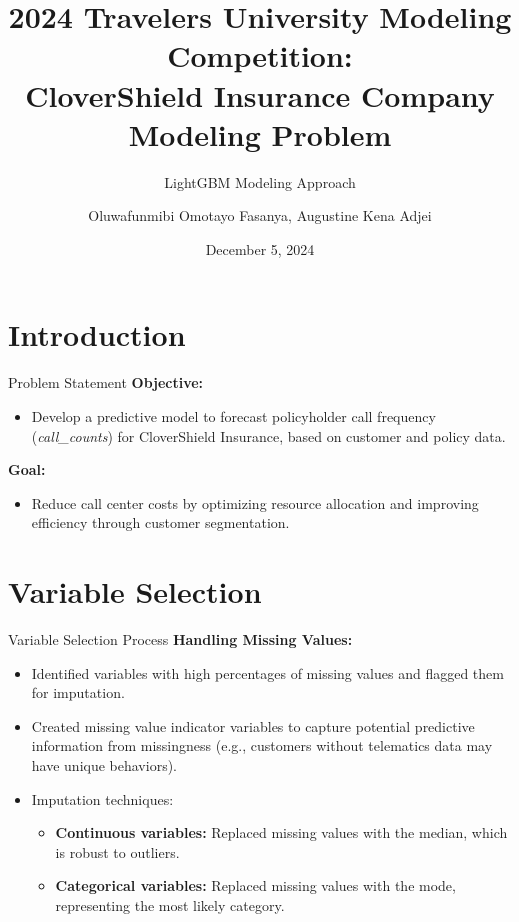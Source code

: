 \documentclass{beamer}\usepackage[]{graphicx}\usepackage[]{xcolor}
\title[Travelers University Modeling Competition]{2024 Travelers University Modeling Competition: \\ CloverShield Insurance Company Modeling Problem}
\subtitle{LightGBM Modeling Approach}
\author[O.F. Fasanya and A.K. Adjei]{Oluwafunmibi Omotayo Fasanya, Augustine Kena Adjei}
\date{December 5, 2024}
\begin{document}
\frame{\titlepage}

\section{Introduction}

\begin{frame}{Problem Statement}
\textbf{Objective:}
\begin{itemize}
    \item Develop a predictive model to forecast policyholder call frequency (\textit{call\_counts}) for CloverShield Insurance, based on customer and policy data.
\end{itemize}

\textbf{Goal:}
\begin{itemize}
    \item Reduce call center costs by optimizing resource allocation and improving efficiency through customer segmentation.
\end{itemize}
\end{frame}

\section{Variable Selection}

\begin{frame}{Variable Selection Process}
\textbf{Handling Missing Values:}
\begin{itemize}
    \item Identified variables with high percentages of missing values and flagged them for imputation.
    \item Created missing value indicator variables to capture potential predictive information from missingness (e.g., customers without telematics data may have unique behaviors).
    \item Imputation techniques:
    \begin{itemize}
        \item \textbf{Continuous variables:} Replaced missing values with the median, which is robust to outliers.
        \item \textbf{Categorical variables:} Replaced missing values with the mode, representing the most likely category.
    \end{itemize}
\end{itemize}
\end{frame}
\end{document}
